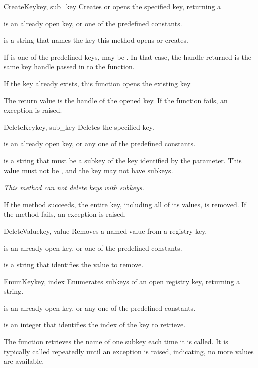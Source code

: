 \begin{funcdesc}{CreateKey}{key, sub_key}
 Creates or opens the specified key, returning a 
 
  is an already open key, or one of the predefined 
  constants.
 
  is a string that names the key this method opens 
 or creates.
 
 If  is one of the predefined keys,  may 
 be . In that case, the handle returned is the same key handle 
 passed in to the function.

 If the key already exists, this function opens the existing key

 The return value is the handle of the opened key.
 If the function fails, an  exception is 
 raised.
\end{funcdesc}


\begin{funcdesc}{DeleteKey}{key, sub_key}
 Deletes the specified key.

  is an already open key, or any one of the predefined 
  constants.
 
  is a string that must be a subkey of the key 
 identified by the  parameter.  This value must not be 
 , and the key may not have subkeys.

 \emph{This method can not delete keys with subkeys.}

 If the method succeeds, the entire key, including all of its values,
 is removed.  If the method fails, an  
 exception is raised.
\end{funcdesc}


\begin{funcdesc}{DeleteValue}{key, value}
  Removes a named value from a registry key.
  
  is an already open key, or one of the predefined 
  constants.
  
  is a string that identifies the value to remove.
\end{funcdesc}


\begin{funcdesc}{EnumKey}{key, index}
  Enumerates subkeys of an open registry key, returning a string.

  is an already open key, or any one of the predefined 
  constants.

  is an integer that identifies the index of the key to 
 retrieve.

 The function retrieves the name of one subkey each time it 
 is called.  It is typically called repeatedly until an 
  exception 
 is raised, indicating, no more values are available.
\end{funcdesc}


